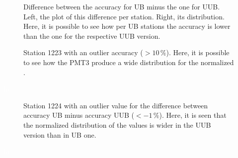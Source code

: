 \documentclass[twoside, final, 10pt]{articleMine}
\begin{document}
\begin{figure}
  \label{figDiffAcc}
  \centering
  \caption{Difference between the accuracy for UB minus the one
  for UUB. Left, the plot of this difference per station. Right,
  its distribution. Here, it is possible to see how per UB
  stations the accuracy is lower than the one for the respective
  UUB version.}
  \label{figDiffAcc}
\end{figure}

\begin{figure}[!t]
  \label{figOutlier1223}
  \centering
  \caption{Station 1223 with an outlier accuracy ($>10\,\%$).
  Here, it is possible to see how the PMT3 produce a wide
  distribution for the normalized \qpkvem.}
  \label{figOutlier1223}
\end{figure}

\textcolor{white}{hi}
\clearpage

\begin{figure}[!t]
  \label{figOutlier1224}
  \centering
  \caption{Station 1224 with an outlier value for the difference
  between accuracy UB minus accuracy UUB ($<-1\,\%$). Here, it is
  seen that the normalized distribution of the \qpkvem values is
  wider in the UUB version than in UB one.}
  \label{figOutlier1224}
\end{figure}

\textcolor{white}{hi}
\clearpage
\end{document}
